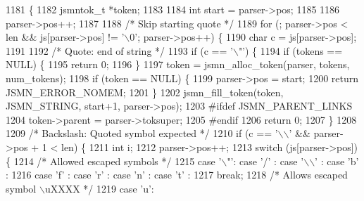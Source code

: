\begin{DoxyCode}
1181                                                           \{
1182     jsmntok\_t *token;
1183 
1184     \textcolor{keywordtype}{int} start = parser->pos;
1185 
1186     parser->pos++;
1187 
1188     \textcolor{comment}{/* Skip starting quote */}
1189     \textcolor{keywordflow}{for} (; parser->pos < len && js[parser->pos] != \textcolor{charliteral}{'\(\backslash\)0'}; parser->pos++) \{
1190         \textcolor{keywordtype}{char} c = js[parser->pos];
1191 
1192         \textcolor{comment}{/* Quote: end of string */}
1193         \textcolor{keywordflow}{if} (c == \textcolor{charliteral}{'\(\backslash\)"'}) \{
1194             \textcolor{keywordflow}{if} (tokens == NULL) \{
1195                 \textcolor{keywordflow}{return} 0;
1196             \}
1197             token = jsmn_alloc_token(parser, tokens, num\_tokens);
1198             \textcolor{keywordflow}{if} (token == NULL) \{
1199                 parser->pos = start;
1200                 \textcolor{keywordflow}{return} JSMN_ERROR_NOMEM;
1201             \}
1202             jsmn_fill_token(token, JSMN_STRING, start+1, parser->pos);
1203 \textcolor{preprocessor}{#ifdef JSMN\_PARENT\_LINKS}
1204             token->parent = parser->toksuper;
1205 \textcolor{preprocessor}{#endif}
1206             \textcolor{keywordflow}{return} 0;
1207         \}
1208 
1209         \textcolor{comment}{/* Backslash: Quoted symbol expected */}
1210         \textcolor{keywordflow}{if} (c == \textcolor{charliteral}{'\(\backslash\)\(\backslash\)'} && parser->pos + 1 < len) \{
1211             \textcolor{keywordtype}{int} i;
1212             parser->pos++;
1213             \textcolor{keywordflow}{switch} (js[parser->pos]) \{
1214                 \textcolor{comment}{/* Allowed escaped symbols */}
1215                 \textcolor{keywordflow}{case} \textcolor{charliteral}{'\(\backslash\)"'}: \textcolor{keywordflow}{case} \textcolor{charliteral}{'/'} : \textcolor{keywordflow}{case} \textcolor{charliteral}{'\(\backslash\)\(\backslash\)'} : \textcolor{keywordflow}{case} \textcolor{charliteral}{'b'} :
1216                 \textcolor{keywordflow}{case} \textcolor{charliteral}{'f'} : \textcolor{keywordflow}{case} \textcolor{charliteral}{'r'} : \textcolor{keywordflow}{case} \textcolor{charliteral}{'n'}  : \textcolor{keywordflow}{case} \textcolor{charliteral}{'t'} :
1217                     \textcolor{keywordflow}{break};
1218                 \textcolor{comment}{/* Allows escaped symbol \(\backslash\)uXXXX */}
1219                 \textcolor{keywordflow}{case} \textcolor{charliteral}{'u'}:

\end{DoxyCode}
